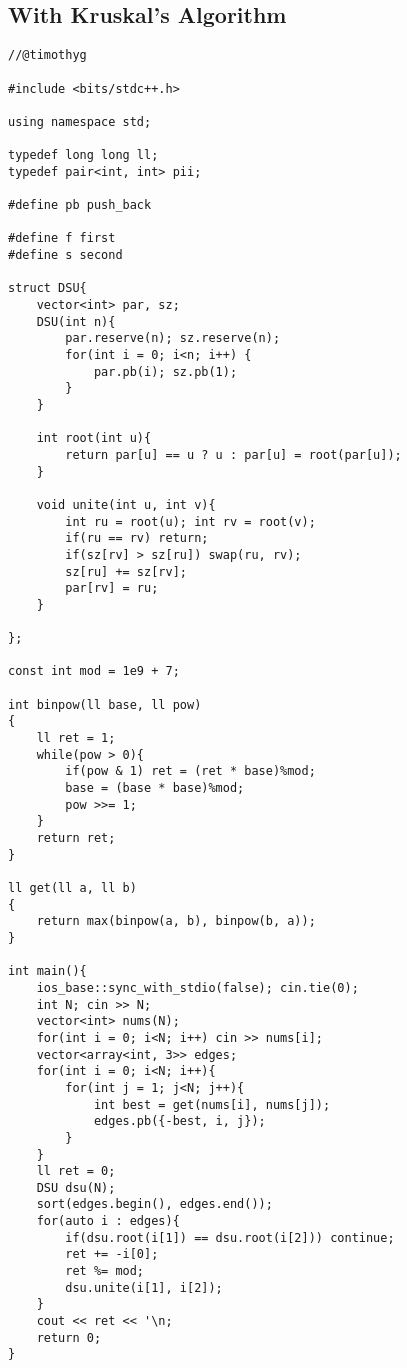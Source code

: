\documentclass[15pt]{article}
\begin{document}
\subsection{With Kruskal's Algorithm}
\begin{lstlisting}
//@timothyg

#include <bits/stdc++.h>
 
using namespace std;
 
typedef long long ll;
typedef pair<int, int> pii;

#define pb push_back

#define f first
#define s second

struct DSU{
    vector<int> par, sz;
    DSU(int n){
        par.reserve(n); sz.reserve(n);
        for(int i = 0; i<n; i++) {
            par.pb(i); sz.pb(1);
        }
    }

    int root(int u){
        return par[u] == u ? u : par[u] = root(par[u]);
    }

    void unite(int u, int v){
        int ru = root(u); int rv = root(v);
        if(ru == rv) return;
        if(sz[rv] > sz[ru]) swap(ru, rv);
        sz[ru] += sz[rv];
        par[rv] = ru;
    }

};

const int mod = 1e9 + 7;

int binpow(ll base, ll pow)
{
    ll ret = 1;
    while(pow > 0){
        if(pow & 1) ret = (ret * base)%mod;
        base = (base * base)%mod;
        pow >>= 1;
    }
    return ret;
}

ll get(ll a, ll b)
{
    return max(binpow(a, b), binpow(b, a));
}

int main(){
    ios_base::sync_with_stdio(false); cin.tie(0);
    int N; cin >> N;
    vector<int> nums(N);
    for(int i = 0; i<N; i++) cin >> nums[i];
    vector<array<int, 3>> edges;
    for(int i = 0; i<N; i++){
        for(int j = 1; j<N; j++){
            int best = get(nums[i], nums[j]);
            edges.pb({-best, i, j});
        }
    }
    ll ret = 0;
    DSU dsu(N);
    sort(edges.begin(), edges.end());
    for(auto i : edges){
        if(dsu.root(i[1]) == dsu.root(i[2])) continue;
        ret += -i[0];
        ret %= mod;
        dsu.unite(i[1], i[2]);
    }
    cout << ret << '\n;
    return 0;
}
\end{lstlisting}
\end{document}
